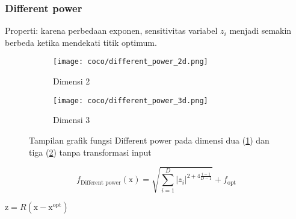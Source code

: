 \subsubsection{Different power}
\noindent Properti:
karena perbedaan exponen, sensitivitas variabel $z_i$ menjadi semakin berbeda ketika mendekati titik optimum.
\begin{figure}[H]
	\centering
	\begin{subfigure}[b]{0.4\textwidth}
		\centering
		\texttt{[image: coco/different\_power\_2d.png]}
		\caption{Dimensi 2}
		\label{fig:dp_2d}
	\end{subfigure}
	\hfill
	\begin{subfigure}[b]{0.4\textwidth}
		\centering
		\texttt{[image: coco/different\_power\_3d.png]}
		\caption{Dimensi 3}
		\label{fig:dp_3d}
	\end{subfigure}
	\caption{Tampilan grafik fungsi Different power pada dimensi dua (\cref{fig:dp_2d}) dan tiga (\cref{fig:dp_3d}) tanpa transformasi input}
	\label{fig:different_power_coco}
\end{figure}
\begin{equation}
  f_{\text{Different power}}(\mathrm{x})=\sqrt{\sum_{i=1}^{D}|z_i|^{2+4\frac{i-1}{D-1}}}+f_{\text{opt}}
\end{equation}
\begin{packed_item}
    \item $\mathrm{z}=R(\mathrm{x}-\mathrm{x}^{\text{opt}})$
\end{packed_item}


